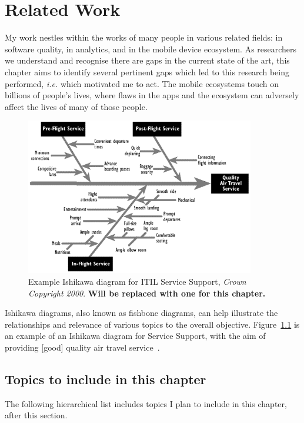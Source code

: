 \chapter{Related Work}
My work nestles within the works of many people in various related fields: in software quality, in analytics, and in the mobile device ecosystem. As researchers we understand and recognise there are gaps in the current state of the art, this chapter aims to identify several pertinent gaps which led to this research being performed, \emph{i.e.} which motivated me to act. The mobile ecosystems touch on billions of people's lives, where flaws in the apps and the ecosystem can adversely affect the lives of many of those people. 

\begin{figure}[ht]
    \centering
    \includegraphics[width=10cm]{images/ishikawa_fishbone_diagram_example_itil.png}
    \caption{Example Ishikawa diagram for ITIL Service Support, \emph{Crown Copyright 2000}. \textbf{Will be replaced with one for this chapter.}}
    \label{fig:ishikawa_example_itil}
\end{figure}

Ishikawa diagrams, also known as fishbone diagrams, can help illustrate the relationships and relevance of various topics to the overall objective. Figure~\ref{fig:ishikawa_example_itil} is an example of an Ishikawa diagram for Service Support, with the aim of providing [good] quality air travel service~\cite{itil_ishikawa_example}. 


\section{Topics to include in this chapter}
The following hierarchical list includes topics I plan to include in this chapter, after this section.


